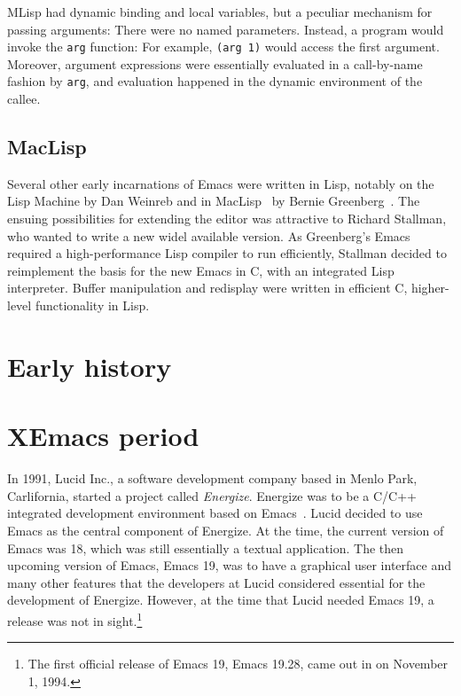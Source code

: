 \documentclass[format=acmsmall, review=false, screen=true]{acmart}
\begin{document}
MLisp had dynamic binding and local variables, but a peculiar
mechanism for passing arguments:  There were no named
parameters.  Instead, a program would invoke the \texttt{arg}
function: For example, \texttt{(arg 1)} would access the first
argument.  Moreover, argument expressions were essentially evaluated
in a call-by-name fashion by \texttt{arg}, and evaluation happened in
the dynamic environment of the callee.

\subsection{MacLisp}

Several other early incarnations of Emacs were written in Lisp,
notably on the Lisp Machine by Dan Weinreb and in
MacLisp~\cite{Moon1974} by Bernie Greenberg~\cite{Stallman2002}.  The
ensuing possibilities for extending the editor was attractive to
Richard Stallman, who wanted to write a new widel available version.
As Greenberg's Emacs required a high-performance Lisp compiler to run
efficiently, Stallman decided to reimplement the basis for the new
Emacs in C, with an integrated Lisp interpreter.  Buffer manipulation
and redisplay were written in efficient C, higher-level functionality
in Lisp.

\section{Early history}         %




\section{XEmacs period}         %

In 1991, Lucid Inc., a software development company based in Menlo
Park, Carlifornia, started a project called \textit{Energize}.
Energize was to be a C/C++ integrated development environment based on
Emacs~\cite{GabrielLetter}.  Lucid decided to use Emacs as the central
component of Energize.  At the time, the current version of Emacs was
18, which was still essentially a textual application.  The then
upcoming version of Emacs, Emacs 19, was to have a graphical user
interface and many other features that the developers at Lucid
considered essential for the development of Energize.  However, at the
time that Lucid needed Emacs 19, a release was not in
sight.\footnote{The first official release of Emacs 19, Emacs
  19.28, came out in on November 1, 1994.}
\end{document}
